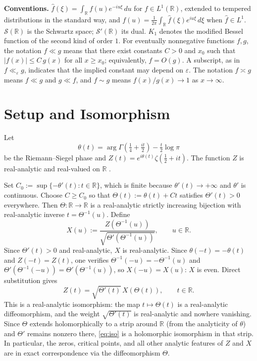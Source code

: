 \documentclass[12pt]{amsart}
\theoremstyle{remark}
\begin{document}
\tableofcontents

\bigskip
\bigskip
\noindent\textbf{Conventions.}\quad
$\hat f(\xi)=\int_\mathbb{R} f(u)e^{-iu\xi}\,du$ for $f\in L^1(\mathbb{R})$,
extended to tempered distributions in the standard way, and
$f(u)=\frac{1}{2\pi}\int_\mathbb{R}\hat f(\xi)e^{iu\xi}\,d\xi$
when $\hat f\in L^1$.
$\mathcal{S}(\mathbb{R})$ is the Schwartz space; $\mathcal{S}'(\mathbb{R})$
its dual.  $K_1$ denotes the modified Bessel function of the second
kind of order $1$.
For eventually nonnegative functions $f,g$, the notation $f\ll g$ means
that there exist constants $C>0$ and $x_0$ such that $|f(x)|\leq C\,g(x)$
for all $x\geq x_0$; equivalently, $f=O(g)$.  A subscript, as in
$f\ll_\varepsilon g$, indicates that the implied constant may depend
on $\varepsilon$.  The notation $f\asymp g$ means $f\ll g$ and $g\ll f$,
and $f\sim g$ means $f(x)/g(x)\to 1$ as $x\to\infty$.

\section{Setup and Isomorphism}\label{sec:setup}

Let
\[
  \theta(t)=\arg\Gamma\!\left(\tfrac14+\tfrac{it}{2}\right)-\tfrac{t}{2}\log\pi
\]
be the Riemann--Siegel phase and $Z(t)=e^{i\theta(t)}\zeta(\tfrac12+it)$.
The function $Z$ is real-analytic and real-valued on $\mathbb{R}$
\cite{Titchmarsh}.

Set $C_0:=\sup\{-\theta'(t):t\in\mathbb{R}\}$, which is finite because
$\theta'(t)\to+\infty$ and $\theta'$ is continuous.  Choose $C\geq C_0$
so that $\Theta(t):=\theta(t)+Ct$ satisfies $\Theta'(t)>0$ everywhere.
Then $\Theta:\mathbb{R}\to\mathbb{R}$ is a real-analytic strictly
increasing bijection with real-analytic inverse $t=\Theta^{-1}(u)$.
Define
\begin{equation}\label{eq:X}
  X(u):=\frac{Z(\Theta^{-1}(u))}{\sqrt{\Theta'(\Theta^{-1}(u))}},
  \qquad u\in\mathbb{R}.
\end{equation}
Since $\Theta'(t)>0$ and real-analytic, $X$ is real-analytic.  Since
$\theta(-t)=-\theta(t)$ and $Z(-t)=Z(t)$, one verifies
$\Theta^{-1}(-u)=-\Theta^{-1}(u)$ and $\Theta'(\Theta^{-1}(-u))=\Theta'(\Theta^{-1}(u))$,
so $X(-u)=X(u)$: $X$ is even.  Direct substitution gives
\begin{equation}\label{eq:iso}
  Z(t)=\sqrt{\Theta'(t)}\,X(\Theta(t)),
  \qquad t\in\mathbb{R}.
\end{equation}
This is a real-analytic isomorphism: the map $t\mapsto\Theta(t)$ is
a real-analytic diffeomorphism, and the weight $\sqrt{\Theta'(t)}$
is real-analytic and nowhere vanishing.  Since $\Theta$ extends
holomorphically to a strip around $\mathbb{R}$ (from the analyticity
of $\theta$) and $\Theta'$ remains nonzero there, \eqref{eq:iso} is
a holomorphic isomorphism in that strip.  In particular, the zeros,
critical points, and all other analytic features of $Z$ and $X$ are
in exact correspondence via the diffeomorphism $\Theta$.
\end{document}

